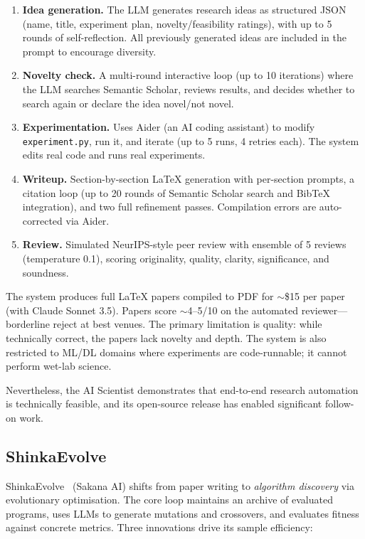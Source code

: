 \documentclass[11pt,a4paper]{article}
\begin{document}
\begin{enumerate}[nosep]
  \item \textbf{Idea generation.} The LLM generates research ideas as
    structured JSON (name, title, experiment plan, novelty/feasibility
    ratings), with up to 5 rounds of self-reflection. All previously
    generated ideas are included in the prompt to encourage diversity.
  \item \textbf{Novelty check.} A multi-round interactive loop (up to
    10 iterations) where the LLM searches Semantic Scholar, reviews
    results, and decides whether to search again or declare the idea
    novel/not novel.
  \item \textbf{Experimentation.} Uses Aider (an AI coding assistant) to
    modify \texttt{experiment.py}, run it, and iterate (up to 5 runs,
    4 retries each). The system edits real code and runs real experiments.
  \item \textbf{Writeup.} Section-by-section \LaTeX{} generation with
    per-section prompts, a citation loop (up to 20 rounds of Semantic
    Scholar search and BibTeX integration), and two full refinement
    passes. Compilation errors are auto-corrected via Aider.
  \item \textbf{Review.} Simulated NeurIPS-style peer review with
    ensemble of 5 reviews (temperature 0.1), scoring originality,
    quality, clarity, significance, and soundness.
\end{enumerate}

\noindent
The system produces full \LaTeX{} papers compiled to PDF for $\sim$\$15
per paper (with Claude Sonnet 3.5). Papers score $\sim$4--5/10 on the
automated reviewer---borderline reject at best venues. The primary
limitation is quality: while technically correct, the papers lack
novelty and depth. The system is also restricted to ML/DL domains where
experiments are code-runnable; it cannot perform wet-lab science.

Nevertheless, the AI Scientist demonstrates that end-to-end research
automation is technically feasible, and its open-source release has
enabled significant follow-on work.

\subsection{ShinkaEvolve}

ShinkaEvolve~\citep{shinkaevolve2025} (Sakana AI) shifts from paper
writing to \emph{algorithm discovery} via evolutionary optimisation.
The core loop maintains an archive of evaluated programs, uses LLMs to
generate mutations and crossovers, and evaluates fitness against
concrete metrics. Three innovations drive its sample efficiency:
\end{document}
